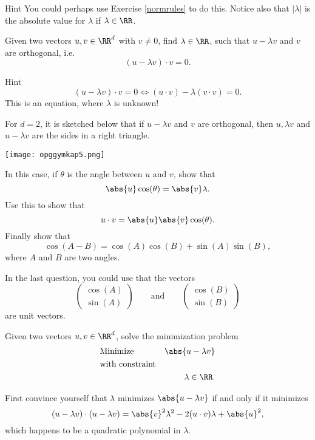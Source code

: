 \documentclass{article}
\begin{document}
\begin{hideinbutton}{Hint}
  You could perhaps use Exercise \ref{normrules} to do this. Notice also that
  $|\lambda|$ is the absolute value for $\lambda$ if $\lambda\in \RR$. 
\end{hideinbutton}
\endshex

\beginshex\label{dim2vec}
Given two vectors $u, v\in \RR^d$ with $v\neq 0$, find $\lambda\in \RR$, such
that $u - \lambda v$ and $v$ are orthogonal, i.e.
$$
(u - \lambda v) \cdot v = 0.
$$

\begin{hideinbutton}{Hint}
  $$
  (u - \lambda v) \cdot v = 0 \iff (u\cdot v) - \lambda (v\cdot v) = 0.
  $$
  This is an equation, where $\lambda$ is unknown!
\end{hideinbutton}

For $d=2$, it is sketched below
that if $u - \lambda v$ and $v$ are orthogonal, then
$u, \lambda v$ and $u-\lambda v$ are the sides in a right triangle.

\texttt{[image: opggymkap5.png]}


In this case, if $\theta$ is the angle between $u$ and $v$, show that
$$
\abs{u} \cos(\theta) = \abs{v} \lambda.
$$
Use this to show that
$$
u\cdot v = \abs{u} \abs{v} \cos(\theta).
$$
Finally show that
$$
\cos(A - B) = \cos(A) \cos(B) + \sin(A) \sin(B),
$$
where $A$ and $B$ are two angles.

\begin{hint}[showhide]
In the last question, you could use that the vectors
$$
\begin{pmatrix}
  \cos(A)\\ \sin(A)
\end{pmatrix}\qquad\text{and}\qquad
\begin{pmatrix}
  \cos(B)\\ \sin(B)
\end{pmatrix}
$$
are unit vectors.
\end{hint}
\endshex


\beginshex
Given two vectors $u, v\in \RR^d$, solve the minimization problem
\begin{align*}
  &\text{Minimize} &\abs{u - \lambda v}&\\
  &\text{with constraint}\\
  &&\lambda\in\RR.
\end{align*}

\begin{hint}[showhide]
  First convince yourself that $\lambda$ minimizes $\abs{u - \lambda v}$
  if and only if it minimizes
  $$
  (u - \lambda v)\cdot (u - \lambda v) = \abs{v}^2 \lambda^2 - 2 (u\cdot v)\lambda + \abs{u}^2,
  $$
  which happens to be a quadratic polynomial in $\lambda$.
\end{hint}
\endshex
\end{document}
